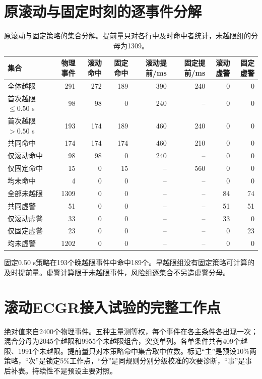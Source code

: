 \documentclass[UTF8,a4paper,11pt]{ctexart}
\begin{document}
\clearpage\section{原滚动与固定时刻的逐事件分解}

\begin{table}[!htbp]\centering\small\setlength{\tabcolsep}{4pt}
\caption{原滚动与固定策略的集合分解。提前量只对各行中及时命中者统计，未越限组的分母为1309。}\label{tab:original-sets}
\begin{tabular}{lrrrrrrr}
\toprule
集合 & 物理事件 & 滚动命中 & 固定命中 & 滚动提前/ms & 固定提前/ms & 滚动虚警 & 固定虚警 \\
\midrule
全体越限 & 291 & 272 & 189 & 390 & 240 & 0 & 0 \\
首次越限 $\leq 0.50$ s & 98 & 98 & 0 & 240 & -- & 0 & 0 \\
首次越限 $>0.50$ s & 193 & 174 & 189 & 460 & 240 & 0 & 0 \\
共同命中 & 174 & 174 & 174 & 460 & 210 & 0 & 0 \\
仅滚动命中 & 98 & 98 & 0 & 240 & -- & 0 & 0 \\
仅固定命中 & 15 & 0 & 15 & -- & 560 & 0 & 0 \\
均未命中 & 4 & 0 & 0 & -- & -- & 0 & 0 \\
全部未越限 & 1309 & 0 & 0 & -- & -- & 84 & 74 \\
共同虚警 & 51 & 0 & 0 & -- & -- & 51 & 51 \\
仅滚动虚警 & 33 & 0 & 0 & -- & -- & 33 & 0 \\
仅固定虚警 & 23 & 0 & 0 & -- & -- & 0 & 23 \\
均未虚警 & 1202 & 0 & 0 & -- & -- & 0 & 0 \\
\bottomrule\end{tabular}\end{table}

固定0.50 s策略在193个晚越限事件中命中189个。早越限组没有固定策略可计算的及时提前量。虚警计算限于未越限事件，风险组逐集合不另造虚警分母。

\clearpage\section{滚动ECGR接入试验的完整工作点}

绝对值来自2400个物理事件。五种主量测等权，每个事件在各主条件各出现一次；混合分母为2045个越限和9955个未越限组合，突变单列。各单条件共有409个越限、1991个未越限。提前量只对本策略命中集合取中位数。标记“主”是预设10\%两策略，“次”是锁定5\%工作点，“分”是同规则分别分级校准的次要诊断，“事”是事后补表。持续性不是预设主要对照。
\end{document}
